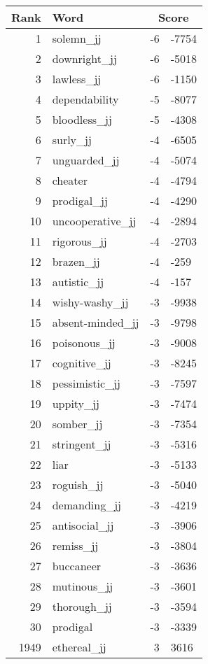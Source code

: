 \begin{longtable}[!htbp]{| rlr@{.}l |}
    \hline
    \textbf{Rank} & \textbf{Word} & \multicolumn{2}{c|}{\textbf{Score}} \\
    \hline
    \endhead
    1 & solemn\_jj & -6 & -7754 \\
    2 & downright\_jj & -6 & -5018 \\
    3 & lawless\_jj & -6 & -1150 \\
    4 & dependability & -5 & -8077 \\
    5 & bloodless\_jj & -5 & -4308 \\
    6 & surly\_jj & -4 & -6505 \\
    7 & unguarded\_jj & -4 & -5074 \\
    8 & cheater & -4 & -4794 \\
    9 & prodigal\_jj & -4 & -4290 \\
    10 & uncooperative\_jj & -4 & -2894 \\
    11 & rigorous\_jj & -4 & -2703 \\
    12 & brazen\_jj & -4 & -259 \\
    13 & autistic\_jj & -4 & -157 \\
    14 & wishy-washy\_jj & -3 & -9938 \\
    15 & absent-minded\_jj & -3 & -9798 \\
    16 & poisonous\_jj & -3 & -9008 \\
    17 & cognitive\_jj & -3 & -8245 \\
    18 & pessimistic\_jj & -3 & -7597 \\
    19 & uppity\_jj & -3 & -7474 \\
    20 & somber\_jj & -3 & -7354 \\
    21 & stringent\_jj & -3 & -5316 \\
    22 & liar & -3 & -5133 \\
    23 & roguish\_jj & -3 & -5040 \\
    24 & demanding\_jj & -3 & -4219 \\
    25 & antisocial\_jj & -3 & -3906 \\
    26 & remiss\_jj & -3 & -3804 \\
    27 & buccaneer & -3 & -3636 \\
    28 & mutinous\_jj & -3 & -3601 \\
    29 & thorough\_jj & -3 & -3594 \\
    30 & prodigal & -3 & -3339 \\
    1949 & ethereal\_jj & 3 & 3616 \\

\end{longtable}
